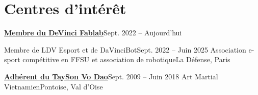 \documentclass[letterpaper,11pt]{article}
\begin{document}
\section{Centres d'intérêt}
  \resumeSubHeadingListStart


    \resumeSubheadingNoSubtitle
      {\href{https://devinci-fablab.fr}{\textbf{Membre  du DeVinci Fablab}}}{Sept. 2022 -- Aujourd'hui}
      
      \resumeItemListStart
      \resumeItemListEnd

    \resumeSubheading
      {Membre de LDV Esport et de DaVinciBot}{Sept. 2022 -- Juin 2025}
      {Association e-sport compétitive en FFSU et association de robotique}{La Défense, Paris}
    
    \resumeSubheading
    {\href{https://www.taysonvodao.fr}{\textbf{Adhérent du TaySon Vo Dao}}}{Sept. 2009 -- Juin 2018}
      {Art Martial Vietnamien}{Pontoise, Val d'Oise}
      \resumeItemListStart
      \resumeItemListEnd
  \resumeSubHeadingListEnd
\end{document}
